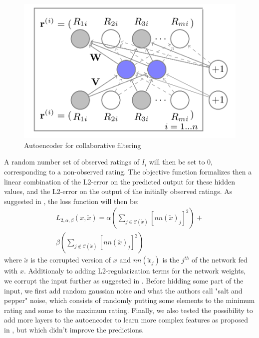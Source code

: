 \documentclass[10pt,conference,compsocconf]{IEEEtran}
\begin{document}
\begin{description}
\begin{figure}[t!]
\centering
\includegraphics[scale=0.25]{autoenc.png}
\caption{Autoencoder for collaborative filtering \cite{autorec}}
\label{autoenc}
\end{figure} 
A random number set of observed ratings of $I_{i}$ will then be set to 0, corresponding to a non-observed rating. The objective function formalizes then a linear combination of the L2-error on the predicted output for these hidden values, and the L2-error on the output of the initially observed ratings.
As suggested in \cite{DBLP:journals/corr/StrubMG16}, the loss function will then be: 
$$
\begin{aligned}
L_{2,\alpha,\beta}(x,\widetilde{x}) = \alpha(\sum\limits_{j \in \mathcal{C}(\widetilde{x})} [nn(\widetilde{x})_{j}]^{2})+ \\ \beta(\sum\limits_{j \notin \mathcal{C}(\widetilde{x})} [nn(\widetilde{x})_{j}]^{2})
\end{aligned}
$$
where $\widetilde{x}$ is the corrupted version of $x$ and $nn(\widetilde{x}_j)$ is the $j^{th}$ of the network fed with $x$. 
\newline
Additionaly to adding L2-regularization terms for the network weights, we corrupt the input further as suggested in \cite{Vincent:2010:SDA:1756006.1953039}. Before hidding some part of the input, we first add random gaussian noise and what the authors call "salt and pepper" noise, which consists of randomly putting some elements to the minimum rating and some to the maximum rating.
\newline 
Finally, we also tested the possibility to add more layers to the autoencoder to learn more complex features as proposed in \cite{Kuchaiev2017TrainingDA}, but which didn't improve the predictions.

\end{description}
\end{document}
